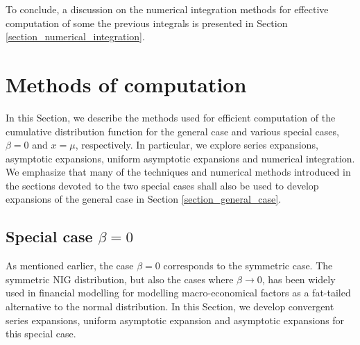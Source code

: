\documentclass[10pt,a4paper,oneside]{article}
\numberwithin{equation}{section}
\begin{document}
To conclude, a discussion on the numerical integration methods for effective computation of some the previous integrals is presented in Section \ref{section_numerical_integration}.

\section{Methods of computation}\label{section_methods_of_computation}
In this Section, we describe the methods used for efficient computation of the cumulative distribution function for the general case and various special cases, $\beta = 0$ and $x=\mu$, respectively. In particular, we explore series expansions, asymptotic expansions, uniform asymptotic expansions and numerical integration. We emphasize that many of the techniques and numerical methods introduced in the sections devoted to the two special cases shall also be used to develop expansions of the general case in Section \ref{section_general_case}.


\subsection{Special case $\beta = 0$}\label{section_special_case_beta_0}
As mentioned earlier, the case $\beta = 0$ corresponds to the symmetric case. The symmetric NIG distribution, but also the cases where $\beta \to 0$, has been widely used in financial modelling for modelling macro-economical factors as a fat-tailed alternative to the normal distribution. In this Section, we develop convergent series expansions, uniform asymptotic expansion and asymptotic expansions for this special case.
\end{document}
